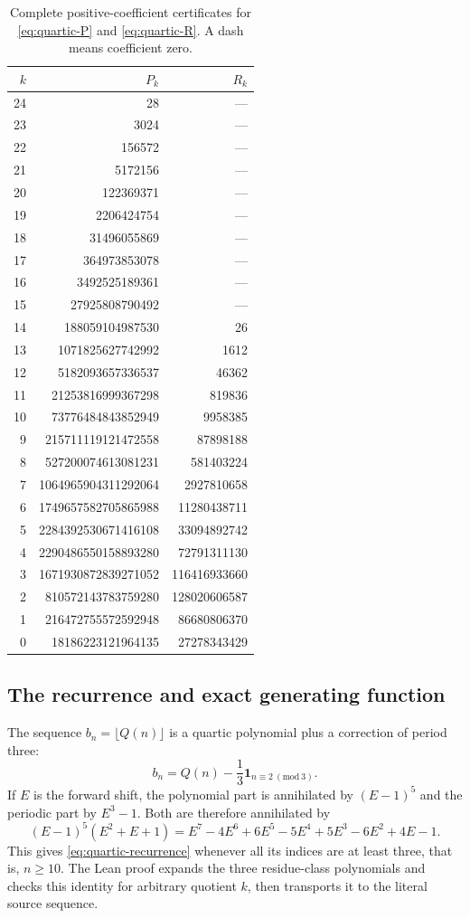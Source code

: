 \begin{table}[p]
\centering
\small
\caption{Complete positive-coefficient certificates for
\eqref{eq:quartic-P} and \eqref{eq:quartic-R}. A dash means coefficient zero.}
\label{tab:quartic-cert}
\begin{tabular}{r|r|r}
$k$&$P_k$&$R_k$\\\hline
24&28&---\\
23&3024&---\\
22&156572&---\\
21&5172156&---\\
20&122369371&---\\
19&2206424754&---\\
18&31496055869&---\\
17&364973853078&---\\
16&3492525189361&---\\
15&27925808790492&---\\
14&188059104987530&26\\
13&1071825627742992&1612\\
12&5182093657336537&46362\\
11&21253816999367298&819836\\
10&73776484843852949&9958385\\
9&215711119121472558&87898188\\
8&527200074613081231&581403224\\
7&1064965904311292064&2927810658\\
6&1749657582705865988&11280438711\\
5&2284392530671416108&33094892742\\
4&2290486550158893280&72791311130\\
3&1671930872839271052&116416933660\\
2&810572143783759280&128020606587\\
1&216472755572592948&86680806370\\
0&18186223121964135&27278343429\\
\end{tabular}
\end{table}

\subsection{The recurrence and exact generating function}

The sequence $b_n=\lfloor Q(n)\rfloor$ is a quartic polynomial plus
a correction of period three:
\[
 b_n=Q(n)-\frac13\mathbf1_{n\equiv2\ (\mathrm{mod}\ 3)}.
\]
If $E$ is the forward shift, the polynomial part is annihilated by
$(E-1)^5$ and the periodic part by $E^3-1$. Both are therefore
annihilated by
\[
 (E-1)^5(E^2+E+1)
 =E^7-4E^6+6E^5-5E^4+5E^3-6E^2+4E-1.
\]
This gives \eqref{eq:quartic-recurrence} whenever all its indices are
at least three, that is, $n\ge10$. The Lean proof expands the three
residue-class polynomials and checks this identity for arbitrary
quotient $k$, then transports it to the literal source sequence.

